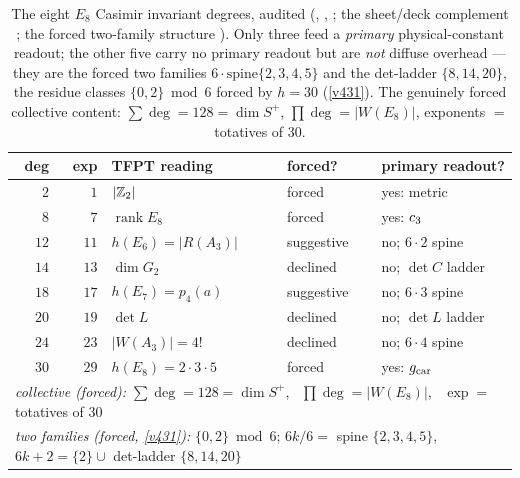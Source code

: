 \begin{table}[h]\centering\footnotesize
\caption{The eight $E_8$ Casimir invariant degrees, audited (, , ; the sheet/deck complement ; the forced two-family structure ). Only three feed a \emph{primary} physical-constant readout; the other five carry no primary readout but are \emph{not} diffuse overhead --- they are the forced two families $6\cdot\text{spine}\{2,3,4,5\}$ and the det-ladder $\{8,14,20\}$, the residue classes $\{0,2\}\bmod6$ forced by $h=30$ (\vref{v431}). The genuinely forced collective content: $\sum\deg = 128 = \dim S^+$, $\prod\deg = |W(E_8)|$, exponents $=$ totatives of $30$.}
\label{tab:e8-degree-audit}
\begin{tabular}{r r l l l}
\toprule
deg & exp & TFPT reading & forced? & primary readout? \\
\midrule
$2$  & $1$  & $|\mathbb{Z}_2|$                & forced     & yes: metric \\
$8$  & $7$  & $\operatorname{rank}E_8$ & forced     & yes: $c_3$ \\
$12$ & $11$ & $h(E_6)=|R(A_3)|$        & suggestive & no; $6{\cdot}2$ spine \\
$14$ & $13$ & $\dim G_2$               & declined   & no; $\det C$ ladder \\
$18$ & $17$ & $h(E_7)=p_4(a)$          & suggestive & no; $6{\cdot}3$ spine \\
$20$ & $19$ & $\det L$                 & declined   & no; $\det L$ ladder \\
$24$ & $23$ & $|W(A_3)|=4!$            & declined   & no; $6{\cdot}4$ spine \\
$30$ & $29$ & $h(E_8)=2{\cdot}3{\cdot}5$ & forced   & yes: $g_{\mathrm{car}}$ \\
\midrule
\multicolumn{5}{l}{\footnotesize\emph{collective (forced):} $\sum\deg=128=\dim S^+$, \ $\prod\deg=|W(E_8)|$, \ $\exp=$ totatives of $30$} \\
\multicolumn{5}{l}{\footnotesize\emph{two families (forced, \vref{v431}):} $\{0,2\}\bmod6$; $6k/6=$ spine $\{2,3,4,5\}$, \ $6k{+}2=\{2\}\cup$ det-ladder $\{8,14,20\}$} \\
\bottomrule
\end{tabular}
\end{table}

